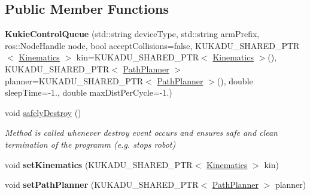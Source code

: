 \subsection*{Public Member Functions}
\begin{DoxyCompactItemize}
\item 
\hypertarget{classkukadu_1_1KukieControlQueue_af8995cf0a8a9e1d5a77d296af0e94b3a}{{\bfseries Kukie\-Control\-Queue} (std\-::string device\-Type, std\-::string arm\-Prefix, ros\-::\-Node\-Handle node, bool accept\-Collisions=false, K\-U\-K\-A\-D\-U\-\_\-\-S\-H\-A\-R\-E\-D\-\_\-\-P\-T\-R$<$ \hyperlink{classkukadu_1_1Kinematics}{Kinematics} $>$ kin=K\-U\-K\-A\-D\-U\-\_\-\-S\-H\-A\-R\-E\-D\-\_\-\-P\-T\-R$<$ \hyperlink{classkukadu_1_1Kinematics}{Kinematics} $>$(), K\-U\-K\-A\-D\-U\-\_\-\-S\-H\-A\-R\-E\-D\-\_\-\-P\-T\-R$<$ \hyperlink{classkukadu_1_1PathPlanner}{Path\-Planner} $>$ planner=K\-U\-K\-A\-D\-U\-\_\-\-S\-H\-A\-R\-E\-D\-\_\-\-P\-T\-R$<$ \hyperlink{classkukadu_1_1PathPlanner}{Path\-Planner} $>$(), double sleep\-Time=-\/1., double max\-Dist\-Per\-Cycle=-\/1.)}\label{classkukadu_1_1KukieControlQueue_af8995cf0a8a9e1d5a77d296af0e94b3a}

\item 
void \hyperlink{classkukadu_1_1KukieControlQueue_a39da1e622d39d7870c9d0e802d5afa4b}{safely\-Destroy} ()
\begin{DoxyCompactList}\small\item\em Method is called whenever destroy event occurs and ensures safe and clean termination of the programm (e.\-g. stops robot) \end{DoxyCompactList}\item 
\hypertarget{classkukadu_1_1KukieControlQueue_a0e8516eeb18eabfe472ef2552adb5855}{void {\bfseries set\-Kinematics} (K\-U\-K\-A\-D\-U\-\_\-\-S\-H\-A\-R\-E\-D\-\_\-\-P\-T\-R$<$ \hyperlink{classkukadu_1_1Kinematics}{Kinematics} $>$ kin)}\label{classkukadu_1_1KukieControlQueue_a0e8516eeb18eabfe472ef2552adb5855}

\item 
\hypertarget{classkukadu_1_1KukieControlQueue_ae4fed3b50bbe1ea52be8ee5b0c327462}{void {\bfseries set\-Path\-Planner} (K\-U\-K\-A\-D\-U\-\_\-\-S\-H\-A\-R\-E\-D\-\_\-\-P\-T\-R$<$ \hyperlink{classkukadu_1_1PathPlanner}{Path\-Planner} $>$ planner)}\label{classkukadu_1_1KukieControlQueue_ae4fed3b50bbe1ea52be8ee5b0c327462}


\end{DoxyCompactItemize}
